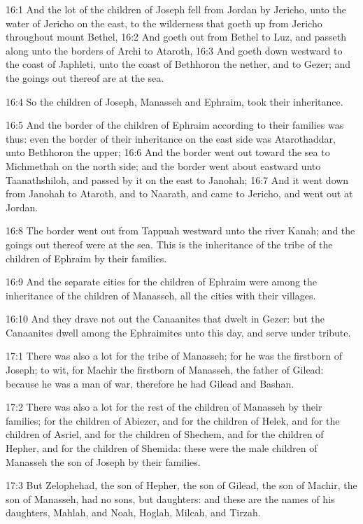 16:1 And the lot of the children of Joseph fell from Jordan by Jericho, unto the water of Jericho on the east, to the wilderness that goeth up from Jericho throughout mount Bethel, 16:2 And goeth out from Bethel to Luz, and passeth along unto the borders of Archi to Ataroth, 16:3 And goeth down westward to the coast of Japhleti, unto the coast of Bethhoron the nether, and to Gezer; and the goings out thereof are at the sea.

16:4 So the children of Joseph, Manasseh and Ephraim, took their inheritance.

16:5 And the border of the children of Ephraim according to their families was thus: even the border of their inheritance on the east side was Atarothaddar, unto Bethhoron the upper; 16:6 And the border went out toward the sea to Michmethah on the north side; and the border went about eastward unto Taanathshiloh, and passed by it on the east to Janohah; 16:7 And it went down from Janohah to Ataroth, and to Naarath, and came to Jericho, and went out at Jordan.

16:8 The border went out from Tappuah westward unto the river Kanah; and the goings out thereof were at the sea. This is the inheritance of the tribe of the children of Ephraim by their families.

16:9 And the separate cities for the children of Ephraim were among the inheritance of the children of Manasseh, all the cities with their villages.

16:10 And they drave not out the Canaanites that dwelt in Gezer: but the Canaanites dwell among the Ephraimites unto this day, and serve under tribute.

17:1 There was also a lot for the tribe of Manasseh; for he was the firstborn of Joseph; to wit, for Machir the firstborn of Manasseh, the father of Gilead: because he was a man of war, therefore he had Gilead and Bashan.

17:2 There was also a lot for the rest of the children of Manasseh by their families; for the children of Abiezer, and for the children of Helek, and for the children of Asriel, and for the children of Shechem, and for the children of Hepher, and for the children of Shemida: these were the male children of Manasseh the son of Joseph by their families.

17:3 But Zelophehad, the son of Hepher, the son of Gilead, the son of Machir, the son of Manasseh, had no sons, but daughters: and these are the names of his daughters, Mahlah, and Noah, Hoglah, Milcah, and Tirzah.

